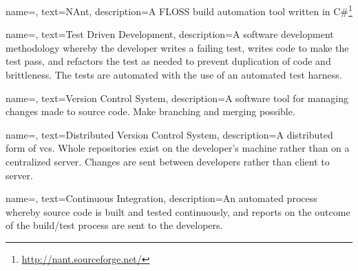 
{
name=,
text=NAnt,
description={A \gls{FLOSS} build automation tool written in C\#\footnote{\url{http://nant.sourceforge.net/}}}
}


{
name=,
text=Test Driven Development,
description={A software development methodology whereby the developer writes a failing test, writes code to make the test pass, and refactors the test as needed to prevent duplication of code and brittleness. The tests are automated with the use of an automated test harness.}
}
	

{
name=,
text=Version Control System,
description={A software tool for managing changes made to source code. Make \gls{branching} and \gls{merging} possible.}
}


{
name=,
text=Distributed Version Control System,
description={A distributed form of \gls{vcs}. Whole repositories exist on the developer's machine rather than on a centralized server. Changes are sent between developers rather than client to server.}
}


{
name=,
text=Continuous Integration,
description={An automated process whereby source code is built and tested continuously, and reports on the outcome of the build/test process are sent to the developers.}
}

